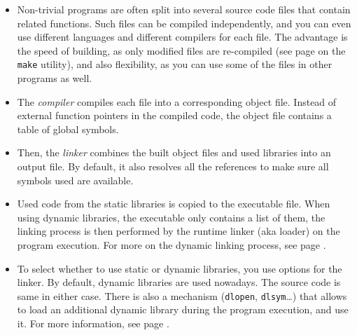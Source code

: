 \begin{itemize}
\item Non-trivial programs are often split into several source code files that
contain related functions.  Such files can be compiled independently, and you
can even use different languages and different compilers for each file.  The
advantage is the speed of building, as only modified files are re-compiled (see
page \pageref{MAKE} on the \texttt{make} utility), and also flexibility, as you
can use some of the files in other programs as well.
\item The \emph{compiler} compiles each file into a corresponding object file.
Instead of external function pointers in the compiled code, the object file
contains a table of global symbols.
\item Then, the \emph{linker} combines the built object files and used
libraries into an output file.  By default, it also resolves all the references
to make sure all symbols used are available. 
\item Used code from the static libraries is copied to the executable file.
When using dynamic libraries, the executable only contains a list of them, the
linking process is then performed by the runtime linker (aka loader) on the
program execution.  For more on the dynamic linking process, see page
\pageref{RUNTIMELINKER}.
\item To select whether to use static or dynamic libraries, you use options for
the linker.  By default, dynamic libraries are used nowadays.  The source code
is same in either case.  There is also a mechanism (\texttt{dlopen},
\texttt{dlsym}\dots) that allows to load an additional dynamic library during
the program execution, and use it.  For more information, see page
\pageref{DLOPEN}.
\end{itemize}


\begin{slide}
\begin{center}

\end{center}
\end{slide}

